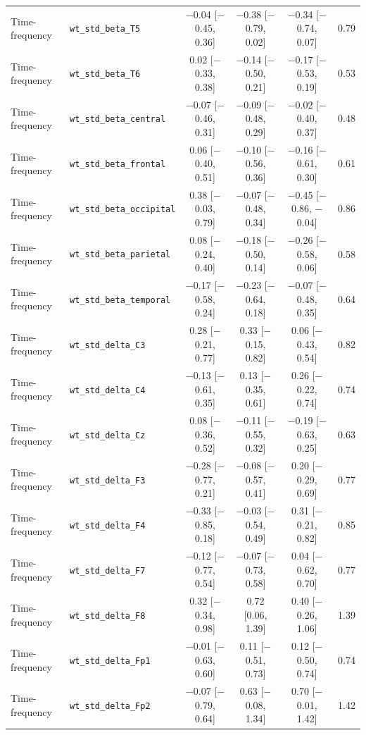 {\begin{longtable}{llcccc}
Time-frequency & \texttt{wt\_std\_beta\_T5} & $-$0.04 [$-$0.45, 0.36] & $-$0.38 [$-$0.79, 0.02] & $-$0.34 [$-$0.74, 0.07] & 0.79 \\
Time-frequency & \texttt{wt\_std\_beta\_T6} & 0.02 [$-$0.33, 0.38] & $-$0.14 [$-$0.50, 0.21] & $-$0.17 [$-$0.53, 0.19] & 0.53 \\
Time-frequency & \texttt{wt\_std\_beta\_central} & $-$0.07 [$-$0.46, 0.31] & $-$0.09 [$-$0.48, 0.29] & $-$0.02 [$-$0.40, 0.37] & 0.48 \\
Time-frequency & \texttt{wt\_std\_beta\_frontal} & 0.06 [$-$0.40, 0.51] & $-$0.10 [$-$0.56, 0.36] & $-$0.16 [$-$0.61, 0.30] & 0.61 \\
Time-frequency & \texttt{wt\_std\_beta\_occipital} & 0.38 [$-$0.03, 0.79] & $-$0.07 [$-$0.48, 0.34] & $-$0.45 [$-$0.86, $-$0.04] & 0.86 \\
Time-frequency & \texttt{wt\_std\_beta\_parietal} & 0.08 [$-$0.24, 0.40] & $-$0.18 [$-$0.50, 0.14] & $-$0.26 [$-$0.58, 0.06] & 0.58 \\
Time-frequency & \texttt{wt\_std\_beta\_temporal} & $-$0.17 [$-$0.58, 0.24] & $-$0.23 [$-$0.64, 0.18] & $-$0.07 [$-$0.48, 0.35] & 0.64 \\
Time-frequency & \texttt{wt\_std\_delta\_C3} & 0.28 [$-$0.21, 0.77] & 0.33 [$-$0.15, 0.82] & 0.06 [$-$0.43, 0.54] & 0.82 \\
Time-frequency & \texttt{wt\_std\_delta\_C4} & $-$0.13 [$-$0.61, 0.35] & 0.13 [$-$0.35, 0.61] & 0.26 [$-$0.22, 0.74] & 0.74 \\
Time-frequency & \texttt{wt\_std\_delta\_Cz} & 0.08 [$-$0.36, 0.52] & $-$0.11 [$-$0.55, 0.32] & $-$0.19 [$-$0.63, 0.25] & 0.63 \\
Time-frequency & \texttt{wt\_std\_delta\_F3} & $-$0.28 [$-$0.77, 0.21] & $-$0.08 [$-$0.57, 0.41] & 0.20 [$-$0.29, 0.69] & 0.77 \\
Time-frequency & \texttt{wt\_std\_delta\_F4} & $-$0.33 [$-$0.85, 0.18] & $-$0.03 [$-$0.54, 0.49] & 0.31 [$-$0.21, 0.82] & 0.85 \\
Time-frequency & \texttt{wt\_std\_delta\_F7} & $-$0.12 [$-$0.77, 0.54] & $-$0.07 [$-$0.73, 0.58] & 0.04 [$-$0.62, 0.70] & 0.77 \\
Time-frequency & \texttt{wt\_std\_delta\_F8} & 0.32 [$-$0.34, 0.98] & 0.72 [0.06, 1.39] & 0.40 [$-$0.26, 1.06] & 1.39 \\
Time-frequency & \texttt{wt\_std\_delta\_Fp1} & $-$0.01 [$-$0.63, 0.60] & 0.11 [$-$0.51, 0.73] & 0.12 [$-$0.50, 0.74] & 0.74 \\
Time-frequency & \texttt{wt\_std\_delta\_Fp2} & $-$0.07 [$-$0.79, 0.64] & 0.63 [$-$0.08, 1.34] & 0.70 [$-$0.01, 1.42] & 1.42 \\

\end{longtable}}

